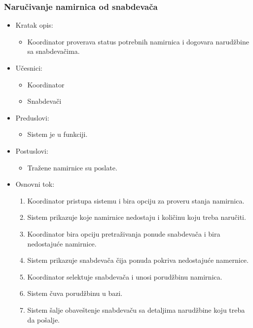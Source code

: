 

\subsubsection{Naručivanje namirnica od snabdevača}


\begin{itemize}
	\item Kratak opis:
		\begin{itemize}
			\item Koordinator proverava status potrebnih namirnica i dogovara narudžbine sa snabdevačima.
		\end{itemize}
	\item Učesnici:
		\begin{itemize}
		    \item Koordinator
		    \item Snabdevači
		\end{itemize}
	\item Preduslovi:
		\begin{itemize}
		   
		    \item Sistem je u funkciji.
		\end{itemize}
	\item Postuslovi:
		\begin{itemize}
			\item Tražene namirnice su poslate.
	\end{itemize}
	\item Osnovni tok:
		\begin{enumerate}
            \item Koordinator pristupa sistemu i bira opciju za proveru stanja namirnica.
           \item Sistem prikazuje koje namirnice nedostaju i količinu koju treba naručiti.
           \item Koordinator bira opciju pretraživanja ponude snabdevača i bira nedostajuće namirnice.
            \item Sistem prikazuje snabdevača čija ponuda pokriva nedostajuće namernice. 
             \item  Koordinator selektuje snabdevača i unosi porudžbinu namirnica.
              \item Sistem čuva porudžbinu u bazi.
             \item Sistem šalje obaveštenje snabdevaču sa detaljima narudžbine koju treba da pošalje.
            

\end{enumerate}
\end{itemize}
